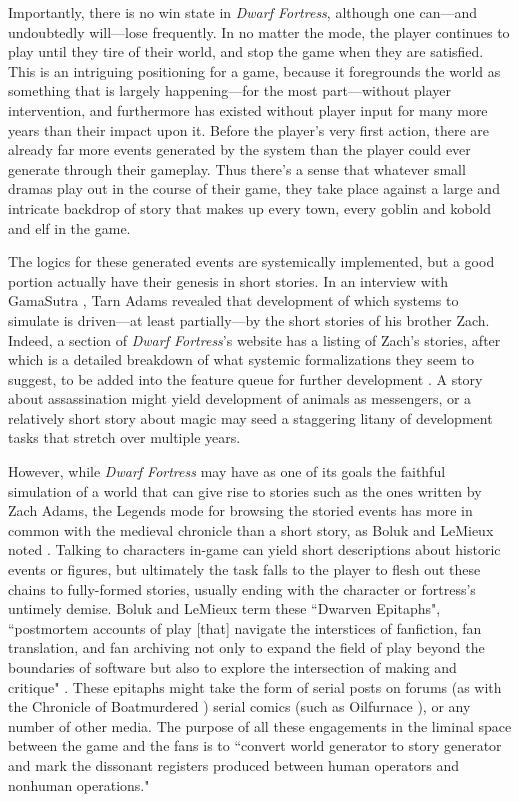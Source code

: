 Importantly, there is no win state in \textit{Dwarf Fortress}, although one can---and undoubtedly will---lose frequently. In no matter the mode, the player continues to play until they tire of their world, and stop the game when they are satisfied. This is an intriguing positioning for a game, because it foregrounds the world as something that is largely happening---for the most part---without player intervention, and furthermore has existed without player input for many more years than their impact upon it. Before the player's very first action, there are already far more events generated by the system than the player could ever generate through their gameplay. Thus there's a sense that whatever small dramas play out in the course of their game, they take place against a large and intricate backdrop of story that makes up every town, every goblin and kobold and elf in the game.

The logics for these generated events are systemically implemented, but a good portion actually have their genesis in short stories. In an interview with GamaSutra \cite{df_history}, Tarn Adams revealed that development of which systems to simulate is driven---at least partially---by the short stories of his brother Zach. Indeed, a section of \textit{Dwarf Fortress}'s website has a listing of Zach's stories, after which is a detailed breakdown of what systemic formalizations they seem to suggest, to be added into the feature queue for further development \cite{df_stories}. A story about assassination might yield development of animals as messengers, or a relatively short story about magic may seed a staggering litany of development tasks that stretch over multiple years.

However, while \textit{Dwarf Fortress} may have as one of its goals the faithful simulation of a world that can give rise to stories such as the ones written by Zach Adams, the Legends mode for browsing the storied events has more in common with the medieval chronicle than a short story, as Boluk and LeMieux noted \cite{boluk2013dwarven}. Talking to characters in-game can yield short descriptions about historic events or figures, but ultimately the task falls to the player to flesh out these chains to fully-formed stories, usually ending with the character or fortress's untimely demise. Boluk and LeMieux term these ``Dwarven Epitaphs", ``postmortem accounts of play [that] navigate the interstices of fanfiction, fan translation, and fan archiving not only to expand the field of play beyond the boundaries of software but also to explore the intersection of making and critique" \cite{boluk2013dwarven}. These epitaphs might take the form of serial posts on forums (as with the Chronicle of Boatmurdered \cite{boatmurdered}) serial comics (such as Oilfurnace \cite{denee}), or any number of other media. The purpose of all these engagements in the liminal space between the game and the fans is to ``convert world generator to story generator and mark the dissonant registers produced between human operators and nonhuman operations." \cite{boluk2013dwarven}

